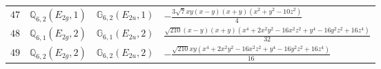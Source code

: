 \documentclass[fleqn,8pt,landscape]{jsarticle}
\begin{document}
\begin{table}[ht!]
\begin{center}
\begin{tabular}{cccl}
$ 47 $ & $ \mathbb{Q}_{6,2}(E_{2g},1) $ & $ \mathbb{G}_{6,2}(E_{2u},1) $ & $ - \frac{3 \sqrt{7} x y \left(x - y\right) \left(x + y\right) \left(x^{2} + y^{2} - 10 z^{2}\right)}{4} $ \\
$ 48 $ & $ \mathbb{Q}_{6,1}(E_{2g},2) $ & $ \mathbb{G}_{6,1}(E_{2u},2) $ & $ \frac{\sqrt{210} \left(x - y\right) \left(x + y\right) \left(x^{4} + 2 x^{2} y^{2} - 16 x^{2} z^{2} + y^{4} - 16 y^{2} z^{2} + 16 z^{4}\right)}{32} $ \\
$ 49 $ & $ \mathbb{Q}_{6,2}(E_{2g},2) $ & $ \mathbb{G}_{6,2}(E_{2u},2) $ & $ - \frac{\sqrt{210} x y \left(x^{4} + 2 x^{2} y^{2} - 16 x^{2} z^{2} + y^{4} - 16 y^{2} z^{2} + 16 z^{4}\right)}{16} $ \\
 \hline \hline
\end{tabular}
\end{center}
\end{table}
\end{document}
